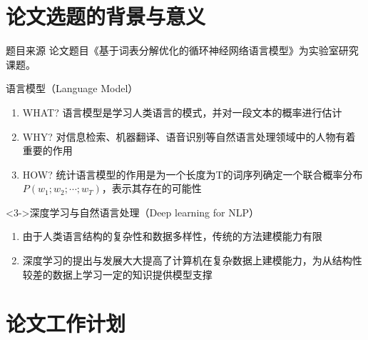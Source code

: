 \documentclass[14pt]{Bredelebeamer}
\begin{document}
\section{论文选题的背景与意义}
\begin{frame}{题目来源}
  论文题目《基于词表分解优化的循环神经网络语言模型》为实验室研究课题。
  \pause
  \begin{block}{语言模型（Language Model）}

    \begin{enumerate}
      \item WHAT? 语言模型是学习人类语言的模式，并对一段文本的概率进行估计
      \item WHY? 对信息检索、机器翻译、语音识别等自然语言处理领域中的人物有着重要的作用
      \item HOW? 统计语言模型的作用是为一个长度为T的词序列确定一个联合概率分布$P(w_1;w_2; \cdots ;w_T)$，表示其存在的可能性
    \end{enumerate}
  \end{block}
  \pause
  \begin{block}<3->{深度学习与自然语言处理（Deep learning for NLP）}
    \begin{enumerate}
      \item 由于人类语言结构的复杂性和数据多样性，传统的方法建模能力有限
      \item 深度学习的提出与发展大大提高了计算机在复杂数据上建模能力，为从结构性较差的数据上学习一定的知识提供模型支撑
    \end{enumerate}
  \end{block}
\end{frame}


\section{论文工作计划}
\end{document}
